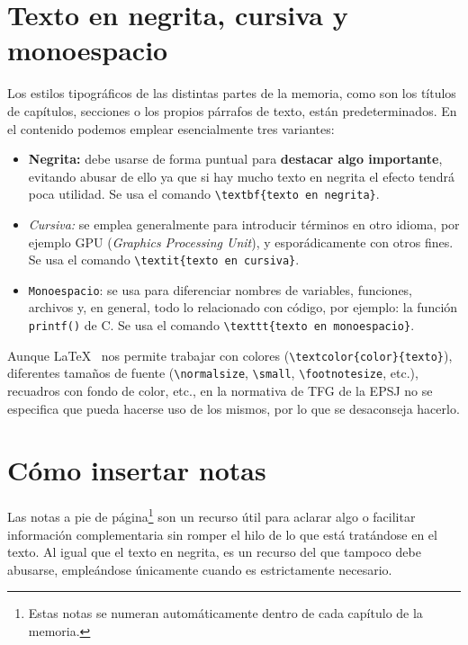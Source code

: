 \section{Texto en negrita, cursiva y monoespacio}

Los estilos tipográficos de las distintas partes de la memoria, como son los títulos de capítulos, secciones o los propios párrafos de texto, están predeterminados. En el contenido podemos emplear esencialmente tres variantes:

\begin{itemize}
    \item \textbf{Negrita:} debe usarse de forma puntual para \textbf{destacar algo importante}, evitando abusar de ello ya que si hay mucho texto en negrita el efecto tendrá poca utilidad. Se usa el comando \verb|\textbf{texto en negrita}|.
    
    \item \textit{Cursiva:} se emplea generalmente para introducir términos en otro idioma, por ejemplo GPU (\textit{Graphics Processing Unit}), y esporádicamente con otros fines. Se usa el comando \verb|\textit{texto en cursiva}|.
    
    \item \texttt{Monoespacio}: se usa para diferenciar nombres de variables, funciones, archivos y, en general, todo lo relacionado con código, por ejemplo: la función \texttt{printf()} de C. Se usa el comando \verb|\texttt{texto en monoespacio}|.
\end{itemize}

Aunque \LaTeX~ nos permite trabajar con colores (\verb|\textcolor{color}{texto}|), diferentes tamaños de fuente (\verb|\normalsize|, \verb|\small|, \verb|\footnotesize|, etc.), recuadros con fondo de color, etc., en la normativa de TFG de la EPSJ no se especifica que pueda hacerse uso de los mismos, por lo que se desaconseja hacerlo.

\section{Cómo insertar notas}

Las notas a pie de página\footnote{Estas notas se numeran automáticamente dentro de cada capítulo de la memoria.} son un recurso útil para aclarar algo o facilitar información complementaria sin romper el hilo de lo que está tratándose en el texto. Al igual que el texto en negrita, es un recurso del que tampoco debe abusarse, empleándose únicamente cuando es estrictamente necesario.

